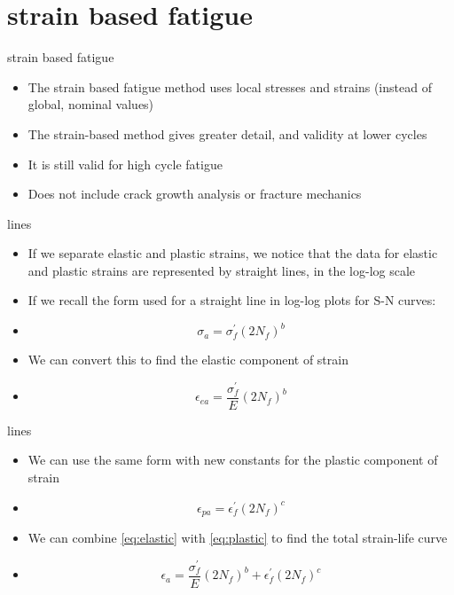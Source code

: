 \documentclass[10pt]{beamer}
\begin{document}
\section{strain based fatigue}

\begin{frame}{strain based fatigue}
	\begin{itemize}[<+->]
		\item The strain based fatigue method uses local stresses and strains (instead of global, nominal values)
		\item The strain-based method gives greater detail, and validity at lower cycles
		\item It is still valid for high cycle fatigue
		\item Does not include crack growth analysis or fracture mechanics
	\end{itemize}
\end{frame}

\begin{frame}{lines}
	\begin{itemize}[<+->]
		\item If we separate elastic and plastic strains, we notice that the data for elastic and plastic strains are represented by straight lines, in the log-log scale
		\item If we recall the form used for a straight line in log-log plots for S-N curves:
		\item[] \begin{equation}
		\sigma_a = \sigma_f^\prime (2N_f)^b
		\end{equation}
		\item We can convert this to find the elastic component of strain
		\item[] \begin{equation}
		\label{eq:elastic}
		\epsilon_{ea} = \frac{\sigma_f^\prime}{E} (2N_f)^b
		\end{equation}
	\end{itemize}
\end{frame}

\begin{frame}{lines}
	\begin{itemize}[<+->]
		\item We can use the same form with new constants for the plastic component of strain
		\item[]\begin{equation}
		\label{eq:plastic}
		\epsilon_{pa} = \epsilon_f^\prime (2 N_f)^c
		\end{equation}
		\item We can combine \ref{eq:elastic} with \ref{eq:plastic} to find the total strain-life curve
		\item[] \begin{equation}
		\epsilon_a = \frac{\sigma_f^\prime}{E} (2N_f)^b + \epsilon_f^\prime (2 N_f)^c
		\end{equation}
	\end{itemize}
\end{frame}
\end{document}

